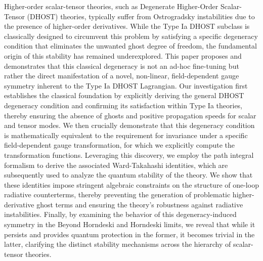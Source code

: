 \documentclass[twocolumn]{aastex631}
\begin{document}
Higher-order scalar-tensor theories, such as Degenerate Higher-Order Scalar-Tensor (DHOST) theories, typically suffer from Ostrogradsky instabilities due to the presence of higher-order derivatives. While the Type Ia DHOST subclass is classically designed to circumvent this problem by satisfying a specific degeneracy condition that eliminates the unwanted ghost degree of freedom, the fundamental origin of this stability has remained underexplored. This paper proposes and demonstrates that this classical degeneracy is not an ad-hoc fine-tuning but rather the direct manifestation of a novel, non-linear, field-dependent gauge symmetry inherent to the Type Ia DHOST Lagrangian. Our investigation first establishes the classical foundation by explicitly deriving the general DHOST degeneracy condition and confirming its satisfaction within Type Ia theories, thereby ensuring the absence of ghosts and positive propagation speeds for scalar and tensor modes. We then crucially demonstrate that this degeneracy condition is mathematically equivalent to the requirement for invariance under a specific field-dependent gauge transformation, for which we explicitly compute the transformation functions. Leveraging this discovery, we employ the path integral formalism to derive the associated Ward-Takahashi identities, which are subsequently used to analyze the quantum stability of the theory. We show that these identities impose stringent algebraic constraints on the structure of one-loop radiative counterterms, thereby preventing the generation of problematic higher-derivative ghost terms and ensuring the theory's robustness against radiative instabilities. Finally, by examining the behavior of this degeneracy-induced symmetry in the Beyond Horndeski and Horndeski limits, we reveal that while it persists and provides quantum protection in the former, it becomes trivial in the latter, clarifying the distinct stability mechanisms across the hierarchy of scalar-tensor theories.
\end{document}
